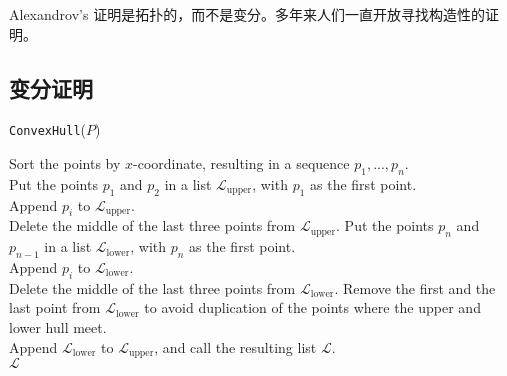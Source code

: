 Alexandrov’s 证明是拓扑的，而不是变分。多年来人们一直开放寻找构造性的证明。

\subsection{变分证明}



\begin{algorithm}[H]
    \renewcommand{\thealgocf}{}
    \caption{\texttt{ConvexHull}($P$)}
    Sort the points by $x$-coordinate, resulting in a sequence $p_1,...,p_n$. \\
    Put the points $p_1$ and $p_2$ in a list $\mathcal{L}_{\mathrm{upper}}$, with $p_1$ as the first point. \\
    {            
        Append $p_i$ to $\mathcal{L}_{\mathrm{upper}}$. \\
        {
            Delete the middle of the last three points from $\mathcal{L}_{\mathrm{upper}}$.
        }
    }
    Put the points $p_n$ and $p_{n−1}$ in a list $\mathcal{L}_{\mathrm{lower}}$, with $p_n$ as the first point. \\
    {            
        Append $p_i$ to $\mathcal{L}_{\mathrm{lower}}$. \\
        {
            Delete the middle of the last three points from $\mathcal{L}_{\mathrm{lower}}$.
        }
    }
    Remove the first and the last point from $\mathcal{L}_{\mathrm{lower}}$ to avoid duplication of the points where the upper and lower hull meet. \\
    Append $\mathcal{L}_{\mathrm{lower}}$ to $\mathcal{L}_{\mathrm{upper}}$, and call the resulting list $\mathcal{L}$. \\
    \Return $\mathcal{L}$
\end{algorithm}